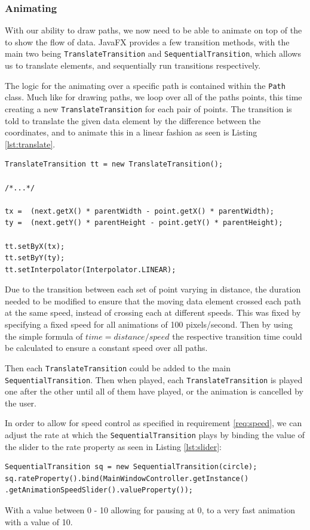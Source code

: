 \subsubsection{Animating}
With our ability to draw paths, we now need to be able to animate on top of the to show the flow of data. JavaFX \cite{sunmicrosystems_2022_javafx} provides a few transition methods, with the main two being \texttt{TranslateTransition} and \texttt{SequentialTransition}, which allows us to translate elements, and sequentially run transitions respectively.

The logic for the animating over a specific path is contained within the \texttt{Path} class. Much like for drawing paths, we loop over all of the paths points, this time creating a new \texttt{TranslateTransition} for each pair of points. The transition is told to translate the given data element by the difference between the coordinates, and to animate this in a linear fashion as seen is Listing \ref{lst:translate}.

\begin{lstlisting}[caption=Translate Transition for two points, label=lst:translate]
TranslateTransition tt = new TranslateTransition();

/*...*/

tx =  (next.getX() * parentWidth - point.getX() * parentWidth);
ty =  (next.getY() * parentHeight - point.getY() * parentHeight);

tt.setByX(tx);
tt.setByY(ty);
tt.setInterpolator(Interpolator.LINEAR);
\end{lstlisting}

Due to the transition between each set of point varying in distance, the duration needed to be modified to ensure that the moving data element crossed each path at the same speed, instead of crossing each at different speeds. This was fixed by specifying a fixed speed for all animations of 100 pixels/second. Then by using the simple formula of $time = distance/speed$ the respective transition time could be calculated to ensure a constant speed over all paths.

Then each \texttt{TranslateTransition} could be added to the main \texttt{SequentialTransition}. Then when played, each \texttt{TranslateTransition} is played one after the other until all of them have played, or the animation is cancelled by the user.

In order to allow for speed control as specified in requirement \ref{req:speed}, we can adjust the rate at which the \texttt{SequentialTransition} plays by binding the value of the slider to the rate property as seen in Listing \ref{lst:slider}:
\begin{lstlisting}[caption=Slider linking code, label=lst:slider]
SequentialTransition sq = new SequentialTransition(circle);
sq.rateProperty().bind(MainWindowController.getInstance() .getAnimationSpeedSlider().valueProperty());
\end{lstlisting}
With a value between 0 - 10 allowing for pausing at 0, to a very fast animation with a value of 10.

